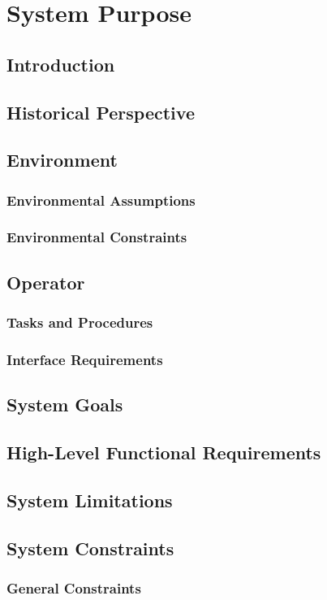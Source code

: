 \documentclass[12pt]{report}
\begin{document}
\tableofcontents

\chapter{System Purpose}
\section{Introduction}
\section{Historical Perspective}
\section{Environment}
\subsection{Environmental Assumptions}
\subsection{Environmental Constraints}
\section{Operator}
\subsection{Tasks and Procedures}
\subsection{Interface Requirements}
\section{System Goals}
\section{High-Level Functional Requirements}
\section{System Limitations}
\section{System Constraints}
\subsection{General Constraints}
\end{document}
